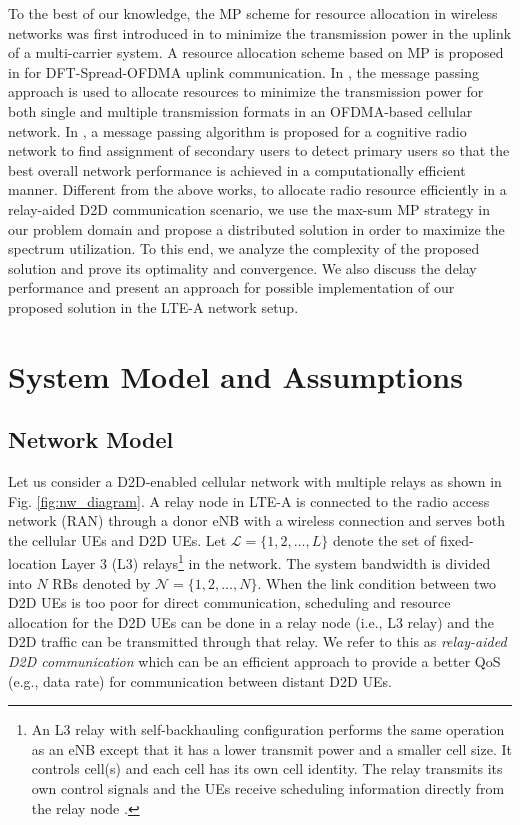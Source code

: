 \documentclass[twocolumn,10pt]{IEEEtran}
\begin{document}
To the best of our knowledge, the MP scheme for resource allocation in wireless networks was first introduced in \cite{mp-icc-09} to minimize the transmission power in the uplink of a multi-carrier system. A resource allocation scheme based on MP is proposed in \cite{mp-dft} for DFT-Spread-OFDMA uplink communication. In \cite{mp-twireless}, the message passing approach is used to allocate resources to minimize the transmission power for both single and multiple transmission formats in an OFDMA-based cellular network. In \cite{cr-pgm-jsac}, a message passing algorithm is proposed for a cognitive radio network to find assignment of secondary users to detect primary users so that the best overall network performance is achieved in a computationally efficient manner. Different from the above works, to allocate radio resource efficiently in a relay-aided D2D communication scenario, we use the max-sum MP strategy in our problem domain and propose a distributed solution in order to maximize the spectrum utilization. To this end, we analyze the complexity of the proposed solution and prove its optimality and convergence. We also discuss the delay performance and present an approach for possible implementation of our proposed solution in the LTE-A network setup. 

\section{System Model and Assumptions} \label{sec:sys_model}

\subsection{Network Model}

Let us consider a D2D-enabled  cellular network with multiple relays as shown in Fig. \ref{fig:nw_diagram}. A relay node in LTE-A is connected to the radio access network (RAN) through a donor eNB with a wireless connection and serves  both the cellular UEs and D2D UEs. Let $\mathcal{L} = \lbrace 1, 2, \ldots, L \rbrace$ denote the set of fixed-location Layer 3 (L3) relays\footnote{An L3 relay with self-backhauling configuration performs the same operation as an eNB except that it has a lower transmit power and a smaller cell size. It controls cell(s) and each cell has its own cell identity. The relay transmits its own control signals and the UEs receive scheduling information directly from the relay node \cite{relay-book-1}.} in the network. The system bandwidth is divided into $N$ RBs denoted by $\mathcal{N} = \lbrace 1, 2, \ldots, N \rbrace$. When the link condition between two D2D UEs is too poor for direct communication,  scheduling and resource allocation for the D2D UEs can be done in a relay node (i.e., L3 relay) and the D2D traffic can be transmitted through that relay. We refer to this as \textit{relay-aided D2D communication} which can be an efficient approach to provide a better QoS  (e.g., data rate) for communication between distant D2D UEs.
\end{document}
